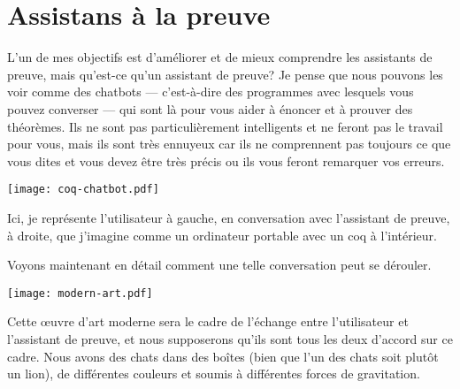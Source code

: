 \section{Assistans à la preuve}

L'un de mes objectifs est d'améliorer et de mieux comprendre les assistants de
preuve, mais qu'est-ce qu'un assistant de preuve?
Je pense que nous pouvons les voir comme des chatbots --- c'est-à-dire des
programmes avec lesquels vous pouvez converser --- qui sont là pour vous aider à
énoncer et à prouver des théorèmes.
Ils ne sont pas particulièrement intelligents et ne feront pas le travail pour
vous, mais ils sont très ennuyeux car ils ne comprennent pas toujours ce que
vous dites et vous devez être très précis ou ils vous feront remarquer vos
erreurs.

%
\begin{center}
  \texttt{[image: coq-chatbot.pdf]}
\end{center}

Ici, je représente l'utilisateur à gauche, en conversation avec l'assistant
de preuve, à droite, que j'imagine comme un ordinateur portable avec un coq à
l'intérieur.

Voyons maintenant en détail comment une telle conversation peut se dérouler.

\begin{center}
  \texttt{[image: modern-art.pdf]}
\end{center}

Cette œuvre d'art moderne sera le cadre de l'échange entre l'utilisateur et
l'assistant de preuve, et nous supposerons qu'ils sont tous les deux d'accord
sur ce cadre.
Nous avons des chats dans des boîtes (bien que l'un des chats soit plutôt un
lion), de différentes couleurs et soumis à différentes forces de gravitation.

